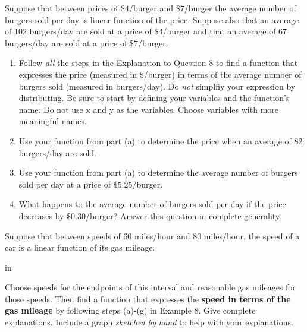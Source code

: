\documentclass{ximera}
\newcommand{\pskip}{\vskip 0.1 in}
\begin{document}
\begin{question}  \label{Qdsfdsfgnn}
Suppose that between prices of $\$4$/burger and $\$7$/burger the average number of burgers sold per day is linear function of the price. Suppose also that an average of 102 burgers/day are sold at a price of $\$4$/burger and that an average of 67 burgers/day are sold at a price of $\$7$/burger.


\begin{enumerate}

\item Follow \emph{all} the steps in the Explanation to Question 8 to find a function that expresses the price (measured in $\$$/burger) in terms of the average number of burgers sold (measured in burgers/day). Do \emph{not} simplfiy your expression by distributing. Be sure to start by defining your variables and the function’s name. Do not use x and y as the variables. Choose variables with more meaningful names.

\item Use your function from part (a) to determine the price when an average of 82 burgers/day are sold.

\item Use your function from part (a) to determine the average number of burgers sold per day at a price of $\$5.25$/burger.

\item What happens to the average number of burgers sold per day if the price decreases by $\$0.30$/burger? Answer this question in complete generality.

\end{enumerate}

\end{question}



\begin{example} \label{Ex6:LF}
Suppose that between speeds of $60$ miles/hour and $80$ miles/hour, the speed of a car is a linear function of its gas mileage. 

\pskip

Choose speeds for the endpoints of this interval and reasonable gas mileages for those speeds. Then find a function that expresses the {\bf speed in terms of the gas mileage} by following steps (a)-(g) in Example 8. Give complete explanations. Include a graph \emph{sketched by hand} to help with your explanations.
\end{example}
\end{document}
